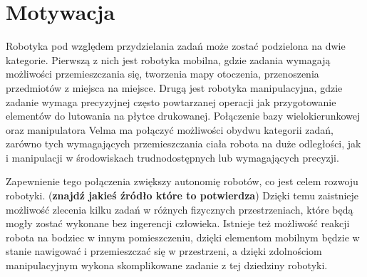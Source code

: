 	\chapter{Motywacja}
		Robotyka pod względem przydzielania zadań może zostać podzielona na dwie kategorie.
		Pierwszą z nich jest robotyka mobilna, gdzie zadania wymagają możliwości przemieszczania się, tworzenia mapy otoczenia, przenoszenia przedmiotów z miejsca na miejsce. 
		Drugą jest robotyka manipulacyjna, gdzie zadanie wymaga precyzyjnej często powtarzanej operacji jak przygotowanie elementów do lutowania na płytce drukowanej. 
		Połączenie bazy wielokierunkowej oraz manipulatora Velma ma połączyć możliwości obydwu kategorii zadań, zarówno tych wymagających przemieszczania ciała robota na duże odległości, jak i manipulacji w środowiskach trudnodostępnych lub wymagających precyzji.

		Zapewnienie tego połączenia zwiększy autonomię robotów, co jest celem rozwoju robotyki. (\textbf{znajdź jakieś źródło które to potwierdza})
		Dzięki temu zaistnieje możliwość zlecenia kilku zadań w różnych fizycznych przestrzeniach, które będą mogły zostać wykonane bez ingerencji człowieka. 
		Istnieje też możliwość reakcji robota na bodziec w innym pomieszczeniu, dzięki elementom mobilnym będzie  w stanie nawigować i przemieszczać się w przestrzeni, a dzięki zdolnościom manipulacyjnym wykona skomplikowane zadanie z tej dziedziny robotyki.
		